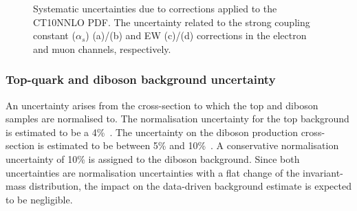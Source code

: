 \begin{figure}[h!]
\begin{subfigure}[h]{0.42\textwidth}
        \caption{}
        \label{fig:uncert:eeEW}
    \end{subfigure}
    \caption{Systematic uncertainties due to corrections applied to the CT10NNLO PDF. The uncertainty related to the strong coupling constant ($\alpha_s$) (a)/(b) and EW (c)/(d) corrections in the electron and muon channels, respectively.}
    \label{fig:uncert:theoryConstants}
\end{figure}

\subsubsection{Top-quark and diboson background uncertainty}
An uncertainty arises from the cross-section to which the top and diboson samples are normalised to. The normalisation uncertainty for the top background is estimated to be a 4\%~\cite{Czakon:2011xx}. The uncertainty on the diboson production cross-section is estimated to be between 5\% and 10\%~\cite{Butterworth:1287902}. A conservative normalisation uncertainty of 10\% is assigned to the diboson background. Since both uncertainties are normalisation uncertainties with a flat change of the invariant-mass distribution, the impact on the data-driven background estimate is expected to be negligible. 

\clearpage